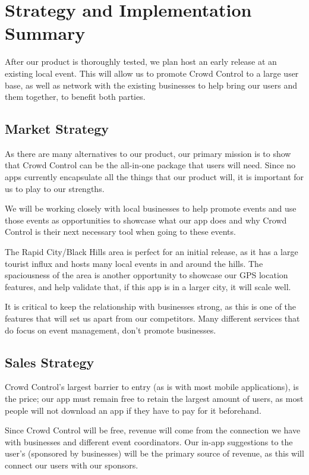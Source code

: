 

\chapter{Strategy and Implementation Summary}

After our product is thoroughly tested, we plan host an early release at an existing local event. This will allow us to promote Crowd Control to a large user base, as well as network with the existing businesses to help bring our users and them together, to benefit both parties.

\section{Market Strategy}
As there are many alternatives to our product, our primary mission is to show that Crowd Control can be the all-in-one package that users will need. Since no apps currently encapsulate all the things that our product will, it is important for us to play to our strengths.

We will be working closely with local businesses to help promote events and use those events as opportunities to showcase what our app does and why Crowd Control is their next necessary tool when going to these events.

The Rapid City/Black Hills area is perfect for an initial release, as it has a large tourist influx and hosts many local events in and around the hills. The spaciousness of the area is another opportunity to showcase our GPS location features, and help validate that, if this app is in a larger city, it will scale well.

It is critical to keep the relationship with businesses strong, as this is one of the features that will set us apart from our competitors. Many different services that do focus on event management, don’t promote businesses.

\section{Sales Strategy}

Crowd Control’s largest barrier to entry (as is with most mobile applications), is the price; our app must remain free to retain the largest amount of users, as most people will not download an app if they have to pay for it beforehand.

Since Crowd Control will be free, revenue will come from the connection we have with businesses and different event coordinators. Our in-app suggestions to the user's (sponsored by businesses) will be the primary source of revenue, as this will connect our users with our sponsors.


